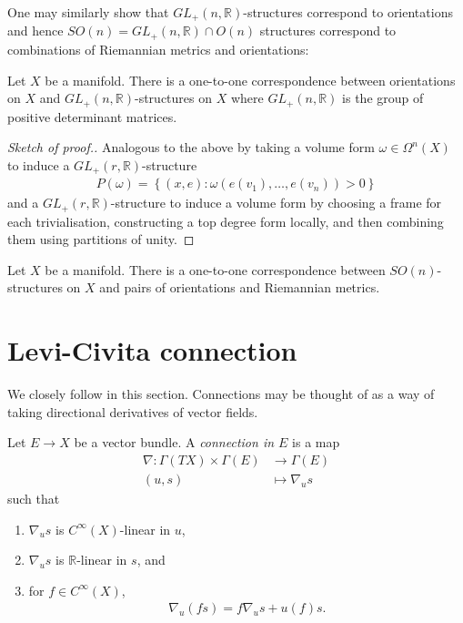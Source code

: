 \documentclass{article}
\begin{document}
One may similarly show that $GL_+(n,\mathbb{R})$-structures correspond
to orientations and hence $SO(n)=GL_+(n,\mathbb{R})\cap O(n)$ structures
correspond to combinations of Riemannian metrics and orientations:

\begin{theorem}
  Let $X$ be a manifold. There is a one-to-one correspondence between
  orientations on $X$ and $GL_+(n,\mathbb{R})$-structures on $X$
  where $GL_+(n,\mathbb{R})$ is the group of positive determinant
  matrices.
  \begin{proof}[Sketch of proof.]
    Analogous to the above by taking a volume form $\omega\in\Omega^n(X)$
    to induce a $GL_+(r,\mathbb{R})$-structure
    \begin{align*}
      P(\omega) = \left\lbrace{(x,e) : \omega(e(v_1),\ldots,e(v_n))>0}\right\rbrace
    \end{align*}
    and a $GL_+(r,\mathbb{R})$-structure to induce a volume form
    by choosing a frame for each trivialisation, constructing a
    top degree form locally, and then combining them using partitions
    of unity.
  \end{proof}
\end{theorem}

\begin{corollary}
  Let $X$ be a manifold. There is a one-to-one correspondence between
  $SO(n)$-structures on $X$ and pairs of orientations and Riemannian
  metrics.
\end{corollary}

\section{Levi-Civita connection}

We closely follow \cite{lee2018} in this section.
Connections may be thought of as a way of taking directional derivatives
of vector fields.

\begin{definition}
  Let $E\to X$ be a vector bundle. A \emph{connection in $E$} is a map
  \begin{align*}
    \nabla : \Gamma(TX) \times \Gamma(E) &\to \Gamma(E) \\
    (u,s) &\mapsto \nabla_u s
  \end{align*}
  such that
  \begin{enumerate}
    \item $\nabla_u s$ is $C^\infty(X)$-linear in $u$,
    \item $\nabla_u s$ is $\mathbb{R}$-linear in $s$, and
    \item for $f\in C^\infty(X)$,
      \begin{align*}
        \nabla_u (fs) = f\nabla_u s + u(f)s.
      \end{align*}
  \end{enumerate}
\end{definition}
\end{document}
